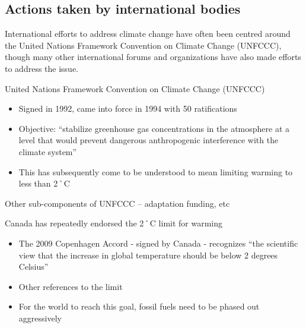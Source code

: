 		\subsection{Actions taken by international bodies}
		
		

International efforts to address climate change have often been centred around the United Nations Framework Convention on Climate Change (UNFCCC), though many other international forums and organizations have also made efforts to address the issue.

United Nations Framework Convention on Climate Change (UNFCCC)
\begin{itemize}
	\item Signed in 1992, came into force in 1994 with 50 ratifications
	\item Objective: ``stabilize greenhouse gas concentrations in the atmosphere at a level that would prevent dangerous anthropogenic interference with the climate system''
	\item This has subsequently come to be understood to mean limiting warming to less than 2˚C
\end{itemize}
	
\textsf{Other sub-components of UNFCCC – adaptation funding, etc}




Canada has repeatedly endorsed the 2˚C limit for warming
\begin{itemize}
	\item The 2009 Copenhagen Accord - signed by Canada - recognizes ``the scientific view that the increase in global temperature should be below 2 degrees Celsius''
	\item \textsf{Other references to the limit}
	\item For the world to reach this goal, fossil fuels need to be phased out aggressively
\end{itemize}
	
